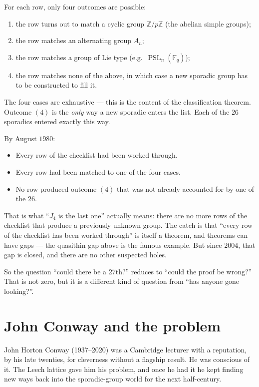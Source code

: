 \documentclass[11pt]{article}
\newcommand{\Z}{\mathbb{Z}}
\begin{document}
For each row, only four outcomes are possible:

\begin{enumerate}[leftmargin=*, itemsep=2pt]
  \item the row turns out to match a cyclic group $\Z/p\Z$
        (the abelian simple groups);
  \item the row matches an alternating group $A_n$;
  \item the row matches a group of Lie type
        (e.g.\ $\operatorname{PSL}_n(\mathbb{F}_q)$);
  \item the row matches none of the above, in which case a new
        sporadic group has to be constructed to fill it.
\end{enumerate}

The four cases are exhaustive --- this is the content of the
classification theorem. Outcome $(4)$ is the \emph{only} way a new
sporadic enters the list. Each of the $26$ sporadics entered
exactly this way.

By August $1980$:
\begin{itemize}[leftmargin=*, itemsep=2pt]
  \item Every row of the checklist had been worked through.
  \item Every row had been matched to one of the four cases.
  \item No row produced outcome $(4)$ that was not already accounted
        for by one of the $26$.
\end{itemize}

That is what ``$J_4$ is the last one'' actually means: there are no
more rows of the checklist that produce a previously unknown group.
The catch is that ``every row of the checklist has been worked
through'' is itself a theorem, and theorems can have gaps --- the
quasithin gap above is the famous example. But since $2004$, that
gap is closed, and there are no other suspected holes.

So the question ``could there be a 27th?'' reduces to ``could the
proof be wrong?'' That is not zero, but it is a different kind of
question from ``has anyone gone looking?''.

\section*{John Conway and the problem}

John Horton Conway (1937--2020) was a Cambridge lecturer with a
reputation, by his late twenties, for cleverness without a flagship
result. He was conscious of it. The Leech lattice gave him his
problem, and once he had it he kept finding new ways back into the
sporadic-group world for the next half-century.
\end{document}
